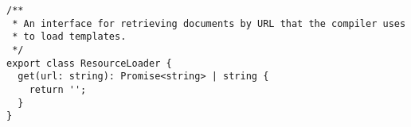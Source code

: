 \begin{verbatim}
/**
 * An interface for retrieving documents by URL that the compiler uses
 * to load templates.
 */
export class ResourceLoader {
  get(url: string): Promise<string> | string {
    return '';
  }
}
\end{verbatim}
